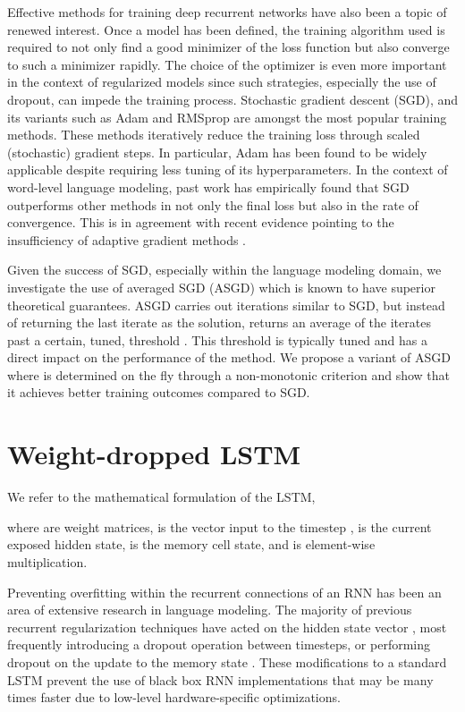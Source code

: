 \documentclass{article}
\begin{document}
Effective methods for training deep recurrent networks have also been a topic of renewed interest. Once a model has been defined, the training algorithm used is required to not only find a good minimizer of the loss function but also converge to such a minimizer rapidly. The choice of the optimizer is even more important in the context of regularized models since such strategies, especially the use of dropout, can impede the training process. Stochastic gradient descent (SGD), and its variants such as Adam \cite{kingma2014adam} and RMSprop \cite{tieleman2012lecture} are amongst the most popular training methods. These methods iteratively reduce the training loss through scaled (stochastic) gradient steps. In particular, Adam has been found to be widely applicable despite requiring less tuning of its hyperparameters. In the context of word-level language modeling, past work has empirically found that SGD outperforms other methods in not only the final loss but also in the rate of convergence. This is in agreement with recent evidence pointing to the insufficiency of adaptive gradient methods \cite{wilson2017marginal}.

Given the success of SGD, especially within the language modeling domain, we investigate the use of averaged SGD (ASGD)  \cite{polyak1992acceleration} which is known to have superior theoretical guarantees.
ASGD carries out iterations similar to SGD, but instead of returning the last iterate as the solution, returns an average of the iterates past a certain, tuned, threshold .
This threshold  is typically tuned and has a direct impact on the performance of the method.
We propose a variant of ASGD where  is determined on the fly through a non-monotonic criterion and show that it achieves better training outcomes compared to SGD.

\section{Weight-dropped LSTM}

We refer to the mathematical formulation of the LSTM,


where  are weight matrices,  is the vector input to the timestep ,  is the current exposed hidden state,  is the memory cell state, and  is element-wise multiplication.

Preventing overfitting within the recurrent connections of an RNN has been an area of extensive research in language modeling.
The majority of previous recurrent regularization techniques have acted on the hidden state vector , most frequently introducing a dropout operation between timesteps, or performing dropout on the update to the memory state .
These modifications to a standard LSTM prevent the use of black box RNN implementations that may be many times faster due to low-level hardware-specific optimizations.
\end{document}
